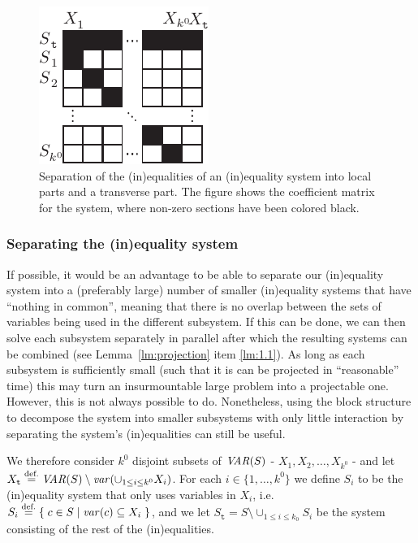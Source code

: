 \begin{figure}
	\centering
		\includegraphics{figures/decomp1B2.pdf}
	\caption{Separation of the (in)equalities of an (in)equality system into local parts and a transverse part. 
	The figure shows the coefficient matrix for the system, where non-zero sections have been colored black.}
	\label{fig:decomp1}
\end{figure}

\subsubsection{Separating the (in)equality system}
If possible, it would be an advantage to be able to separate our (in)equality system into a (preferably large) number of smaller (in)equality systems that have ``nothing in common'', meaning that there is no overlap between the sets of variables being used in the different subsystem. If this can be done, we can then solve each subsystem separately in parallel after which the resulting systems can be combined (see Lemma~\ref{lm:projection} item \ref{lm:1.1}). As long as each subsystem is sufficiently small (such that it is can be projected in ``reasonable'' time) this may turn an insurmountable large problem into a projectable one. 
However, this is not always possible to do. Nonetheless, using the block structure to decompose the system into smaller subsystems with only little interaction by separating the system's (in)equalities can still be useful. 
 
We therefore consider $k^0$ disjoint subsets of $\mathit{VAR}(S)$ - $X_1, X_2,\ldots, X_{k^0}$ - and let $X_{\texttt{t}}\overset{\text{def.}}= \mathit{VAR}(S)\setminus \mathit{var}(\cup_{1\leq i\leq k^0}X_i)$. For each $i\in\{1,\ldots, k^0\}$ we define $S_i$ to be the (in)equality system that only uses variables in $X_i$, i.e. $S_i \overset{\text{def.}}= \{\;{c\in S}\;|\;{\mathit{var}(c)\subseteq X_i}\;\}$, and we let $S_\texttt{t} = S\setminus \cup_{1\leq i \leq k_0}S_i$ be the system consisting of the rest of the (in)equalities. 

